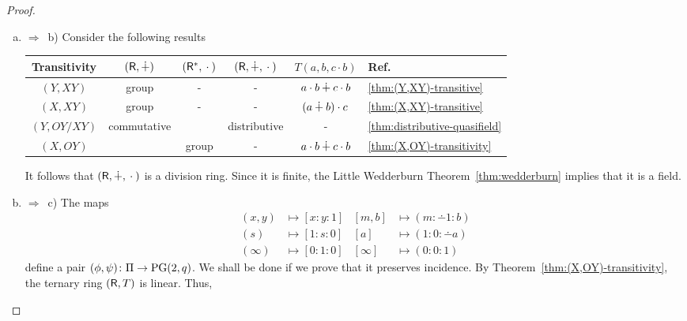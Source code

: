 \begin{proof}${}$
    \begin{enumerate}[a)]
        \item$\Rightarrow$~b) Consider the following results
        \begin{center}\footnotesize
            \begin{tabular}{c|ccccl}
                Transitivity
                    &$(\mathsf R,\dotplus)$
                    &$(\mathsf R^*,{}\cdot{})$
                    &$(\mathsf R,\dotplus,{}\cdot{})$
                    &$T(a,b,c\cdot b)$
                    &Ref.\\
                \hline\rule{0mm}{3mm}
                $(Y,XY)$
                    &group
                    &-
                    &-
                    &$a\cdot b\dotplus c\cdot b$
                    &\ref{thm:(Y,XY)-transitive}\\
                $(X,XY)$
                    &group
                    &-
                    &-
                    &$(a\dotplus b)\cdot c$
                    &\ref{thm:(X,XY)-transitive}\\
                $(Y,OY/XY)$
                    &commutative
                    &
                    &distributive
                    &-
                    &\ref{thm:distributive-quasifield}\\
                $(X,OY)$
                    &
                    &group
                    &-
                    &$a\cdot b\dotplus c\cdot b$
                    &\ref{thm:(X,OY)-transitivity}
            \end{tabular}
        \end{center}
        It follows that $(\mathsf R,\dotplus,{}\cdot{})$ is a division ring. Since it is finite, the Little Wedderburn Theorem~\ref{thm:wedderburn} implies that it is a field.

        \item$\Rightarrow$~c) The maps
        \begin{align*}
            (x,y)&\longmapsto[x:y:1]    &[m,b]&\longmapsto(m:\dotminus1:b)\\
            (s)&\longmapsto[1:s:0]      &[a]&\longmapsto(1:0:\dotminus a)\\
            (\infty)&\longmapsto[0:1:0] &[\infty]&\longmapsto(0:0:1)
        \end{align*}
        define a pair $(\phi,\psi)\colon\Pi\to\operatorname{PG}(2,q)$. We shall be done if we prove that it preserves incidence. By Theorem~\ref{thm:(X,OY)-transitivity}, the ternary ring\/ $(\mathsf R,T)$ is linear. Thus,
    

\end{enumerate}
\end{proof}
